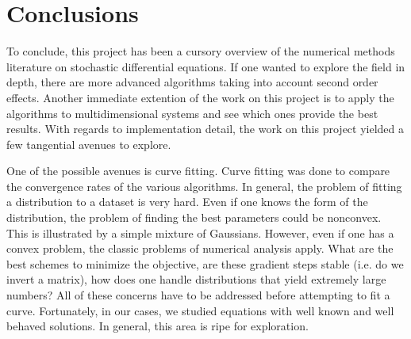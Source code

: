 \documentclass[notitlepage,pra,10pt,aps]{revtex4-2}
\begin{document}
\section{Conclusions}

To conclude, this project has been a cursory overview of the numerical methods literature on stochastic differential equations. If one wanted to explore the field in depth, there are more advanced algorithms taking into account second order effects. Another immediate extention of the work on this project is to apply the algorithms to multidimensional systems and see which ones provide the best results. With regards to implementation detail, the work on this project yielded a few tangential avenues to explore.

One of the possible avenues is curve fitting. Curve fitting was done to compare the convergence rates of the various algorithms. In general, the problem of fitting a distribution to a dataset is very hard. Even if one knows the form of the distribution, the problem of finding the best parameters could be nonconvex. This is illustrated by a simple mixture of Gaussians. However, even if one has a convex problem, the classic problems of numerical analysis apply. What are the best schemes to minimize the objective, are these gradient steps stable (i.e. do we invert a matrix), how does one handle distributions that yield extremely large numbers? All of these concerns have to be addressed before attempting to fit a curve. Fortunately, in our cases, we studied equations with well known and well behaved solutions. In general, this area is ripe for exploration.




\end{document}
